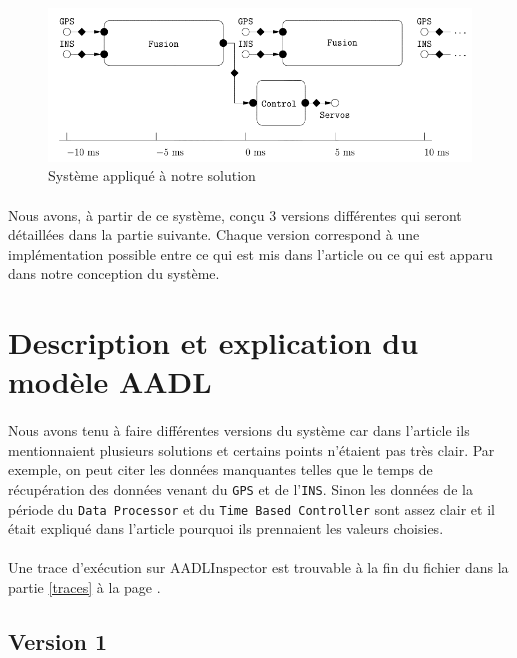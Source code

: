 \documentclass[a4paper,12pt]{report}
\begin{document}
		\begin{figure}[H]
			\centering
				\includegraphics[scale=0.7]{archi.png}
				\caption{Système appliqué à notre solution}
			\label{archi}
		\end{figure}
			
		\paragraph*{}
		Nous avons, à partir de ce système, conçu 3 versions différentes qui seront détaillées dans la partie suivante. Chaque version correspond à une implémentation possible entre ce qui est mis dans l'article ou ce qui est apparu dans notre conception du système.
		
	\section{Description et explication du modèle AADL}
		\paragraph*{}
		Nous avons tenu à faire différentes versions du système car dans l'article ils mentionnaient plusieurs solutions et certains points n'étaient pas très clair.
		Par exemple, on peut citer les données manquantes telles que le temps de récupération des données venant du \texttt{GPS} et de l'\texttt{INS}. Sinon les données de la période du \texttt{Data Processor} et du \texttt{Time Based Controller} sont assez clair et il était expliqué dans l'article pourquoi ils prennaient les valeurs choisies.
		
		\paragraph*{}
		Une trace d'exécution sur AADLInspector est trouvable à la fin du fichier dans la partie \ref{traces} à la page \pageref{traces}.
		
		
		\subsection{Version 1}
\end{document}
